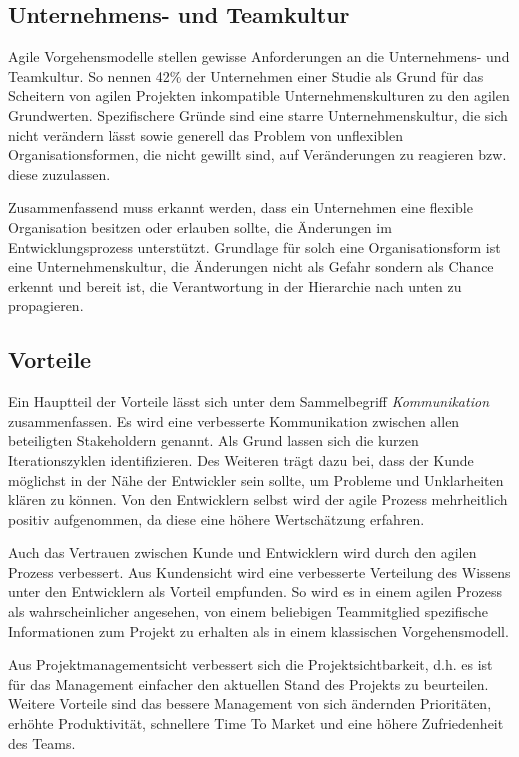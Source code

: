 \subsection{Unternehmens- und Teamkultur} %

Agile Vorgehensmodelle stellen gewisse Anforderungen an die Unternehmens- und Teamkultur.
So nennen 42\% der Unternehmen einer Studie als Grund für das Scheitern von agilen Projekten inkompatible Unternehmenskulturen zu den agilen Grundwerten. 
Spezifischere Gründe sind eine starre Unternehmenskultur, die sich nicht verändern lässt sowie generell das Problem von unflexiblen Organisationsformen, die nicht gewillt sind, auf Veränderungen zu reagieren bzw. diese zuzulassen.
\parencite[Vgl.][S. 10]{VersionOne:2015aa}

Zusammenfassend muss erkannt werden, dass ein Unternehmen eine flexible Organisation besitzen oder erlauben sollte, die Änderungen im Entwicklungsprozess unterstützt.
Grundlage für solch eine Organisationsform ist eine Unternehmenskultur, die Änderungen nicht als Gefahr sondern als Chance erkennt und bereit ist, die Verantwortung in der Hierarchie nach unten zu propagieren.

\subsection{Vorteile} %

Ein Hauptteil der Vorteile lässt sich unter dem Sammelbegriff \emph{Kommunikation} zusammenfassen.
Es wird eine verbesserte Kommunikation zwischen allen beteiligten Stakeholdern genannt.
Als Grund lassen sich die kurzen Iterationszyklen identifizieren. 
Des Weiteren trägt dazu bei, dass der Kunde möglichst in der Nähe der Entwickler sein sollte, um Probleme und Unklarheiten klären zu können.
Von den Entwicklern selbst wird der agile Prozess mehrheitlich positiv aufgenommen, da diese eine höhere Wertschätzung erfahren.
\parencite[Vgl.][S. 658]{Petersen:2010aa}

Auch das Vertrauen zwischen Kunde und Entwicklern wird durch den agilen Prozess verbessert.
Aus Kundensicht wird eine verbesserte Verteilung des Wissens unter den Entwicklern als Vorteil empfunden.
So wird es in einem agilen Prozess als wahrscheinlicher angesehen, von einem beliebigen Teammitglied spezifische Informationen zum Projekt zu erhalten als in einem klassischen Vorgehensmodell.
\parencite[Vgl.][S. 498 f.]{Bomarius:2005aa}

Aus Projektmanagementsicht verbessert sich die Projektsichtbarkeit, d.h. es ist für das Management einfacher den aktuellen Stand des Projekts zu beurteilen.
Weitere Vorteile sind das bessere Management von sich ändernden Prioritäten, erhöhte Produktivität, schnellere Time To Market und eine höhere Zufriedenheit des Teams.
\parencite[Vgl.][]{VersionOne:2015aa}

